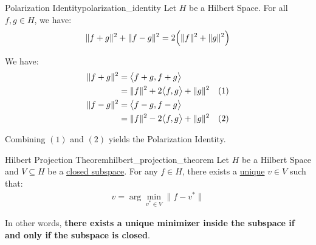 \begin{lemma}{Polarization Identity}{polarization_identity}
    Let $H$ be a Hilbert Space. For all $f,g\in H$, we have:
    \begin{align*}
        \|f + g\|^2 + \|f - g\|^2 = 2\Big(  \|f\|^2 + \|g\|^2  \Big)
    \end{align*}
\end{lemma}

\begin{proof*}
    We have:
    \begin{align*}
        \|f+g\|^2 &= \big<f + g, f + g\big> \\
            &= \|f\|^2 + 2 \big<f, g\big> + \|g\|^2 \ \ \ (1) \\
        \|f-g\|^2 &= \big<f - g, f - g\big> \\
            &= \|f\|^2 - 2 \big<f, g\big> + \|g\|^2 \ \ \ (2) \\
    \end{align*}

    \noindent Combining $(1)$ and $(2)$ yields the Polarization Identity.
\end{proof*}

\begin{theorem}{Hilbert Projection Theorem}{hilbert_projection_theorem}
    Let $H$ be a Hilbert Space and $V\subseteq H$ be a \underline{closed subspace}. For any $f\in H$, there exists a \underline{unique} $v \in V$ such that:
    \begin{align*}
        v = \arg\min_{v^* \in V} \| f - v^*\|
    \end{align*}

    In other words, \textbf{there exists a unique minimizer inside the subspace if and only if the subspace is closed}.
\end{theorem}

